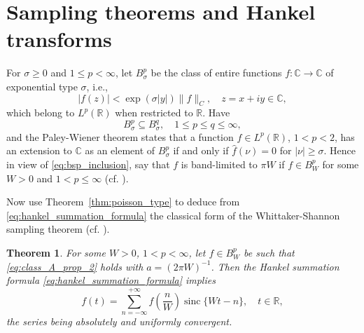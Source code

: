\documentclass[11pt]{article}
\theoremstyle{plain}
\newtheorem{theorem}{Theorem}
\begin{document}
\section{Sampling theorems and Hankel transforms}
\label{sec:sampling}

For $\sigma \geq 0$ and $1 \leq p < \infty$, let $B_\sigma^p$ be the class of entire functions $f: \mathbb{C} \to \mathbb{C}$ of exponential type $\sigma$, i.e.,
\begin{equation}
|f(z)| < \exp(\sigma |y|) \|f\|_C, \quad z = x + iy \in \mathbb{C},
\label{eq:exponential_type}
\end{equation}
which belong to $L^p(\mathbb{R})$ when restricted to $\mathbb{R}$. Have
\begin{equation}
B_\sigma^p \subseteq B_\sigma^q, \quad 1 \leq p \leq q \leq \infty,
\label{eq:bsp_inclusion}
\end{equation}
and the Paley-Wiener theorem states that a function $f \in L^p(\mathbb{R})$, $1 < p < 2$, has an extension to $\mathbb{C}$ as an element of $B_\sigma^p$ if and only if $\hat{f}(\nu) = 0$ for $|\nu| \geq \sigma$. Hence in view of \eqref{eq:bsp_inclusion}, say that $f$ is band-limited to $\pi W$ if $f \in B_W^p$ for some $W > 0$ and $1 < p \leq \infty$ (cf. \cite{8}).

Now use Theorem~\ref{thm:poisson_type} to deduce from \eqref{eq:hankel_summation_formula} the classical form of the Whittaker-Shannon sampling theorem (cf. \cite{8}).

\begin{theorem}
\label{thm:hankel_shannon}
For some $W > 0$, $1 < p < \infty$, let $f \in B_W^p$ be such that \eqref{eq:class_A_prop_2} holds with $a = (2\pi W)^{-1}$. Then the Hankel summation formula \eqref{eq:hankel_summation_formula} implies
\begin{equation}
f(t) = \sum_{n=-\infty}^{+\infty} f\left(\frac{n}{W}\right) \operatorname{sinc}\{Wt - n\}, \quad t \in \mathbb{R},
\label{eq:hankel_shannon_result}
\end{equation}
the series being absolutely and uniformly convergent.
\end{theorem}
\end{document}
